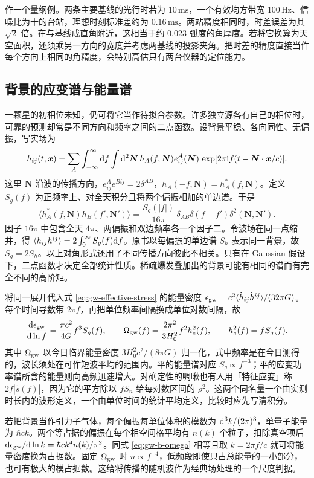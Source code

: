 作一个量纲例。两条主要基线的光行时若为 $10\,\mathrm{ms}$，一个有效均方带宽 $100\,\mathrm{Hz}$、信噪比为十的台站，理想时刻标准差约为 $0.16\,\mathrm{ms}$。两站精度相同时，时差误差为其 $\sqrt2$ 倍。在与基线成直角附近，这相当于约 $0.023$ 弧度的角厚度。若将它换算为天空面积，还须乘另一方向的宽度并考虑两基线的投影夹角。把时差的精度直接当作每个方向上相同的角精度，会特别高估只有两台仪器的定位能力。

\subsection{背景的应变谱与能量谱}\label{sec:gw-b-background}
一颗星的初相位未知，仍可将它当作待拟合参数。许多独立源各有自己的相位时，可靠的预测却常是不同方向和频率之间的二点函数。设背景平稳、各向同性、无偏振，写实场为
\[
 h_{ij}(t,\bm x)=\sum_A\int_{-\infty}^\infty\dd f\int\dd^2\bm N\,
  h_A(f,\bm N)e^A_{ij}(\bm N)\,
  \exp[2\pi\mathrm{i} f(t-\bm N\cdot\bm x/c)] .
\]
这里 $\bm N$ 沿波的传播方向，$e^A_{ij}e^{Bij}=2\delta^{AB}$，$h_A(-f,\bm N)=h_A^*(f,\bm N)$。定义 $S_g(f)$ 为正频率上、对全天积分且将两个偏振相加的单边谱。于是
\[
 \langle h_A^*(f,\bm N)h_B(f',\bm N')\rangle
 =\frac{S_g(|f|)}{16\pi}\,
 \delta_{AB}\delta(f-f')\delta^2(\bm N,\bm N') .
\]
因子 $16\pi$ 中包含全天 $4\pi$、两偏振和双边频率各一个因子二。令波场在同一点缩并，得 $\langle h_{ij}h^{ij}\rangle=2\int_0^\infty S_g(f)\dd f$。原书以每偏振的单边谱 $S_h$ 表示同一背景，故 $S_g=2S_h$。以上对角形式还用了不同传播方向彼此不相关。只有在 Gaussian 假设下，二点函数才决定全部统计性质。稀疏爆发叠加出的背景可能有相同的谱而有完全不同的高阶矩。

将同一展开代入式 \eqref{eq:gw-effective-stress} 的能量密度 $\epsilon_{\rm gw}=c^2\langle\dot h_{ij}\dot h^{ij}\rangle/(32\pi G)$。每个时间导数带 $2\pi f$，再把单位频率间隔换成单位对数间隔，故
\begin{equation}\label{eq:gw-b-omega}
 \frac{\dd\epsilon_{\rm gw}}{\dd\ln f}=\frac{\pi c^2}{4G}f^3 S_g(f),
 \qquad \Omega_{\rm gw}(f)=\frac{2\pi^2}{3H_0^2}f^2h_c^2(f),
 \qquad h_c^2(f)=fS_g(f).
\end{equation}
其中 $\Omega_{\rm gw}$ 以今日临界能量密度 $3H_0^2c^2/(8\pi G)$ 归一化，式中频率是在今日测得的，波长须处在可作短波平均的范围内。平的能量谱对应 $S_g\propto f^{-3}$；平的应变功率谱所含的能量则向高频迅速增大。对确定性的啁啾也有人用「特征应变」称 $2f|\tilde s(f)|$，因为它的平方除以 $fS_n$ 给每对数区间的 $\rho^2$。这两个同名量一个由实测时长内的波形定义，一个由单位时间的统计平均定义，比较时应先写清积分。

若把背景当作引力子气体，每个偏振每单位体积的模数为 $\dd^3 k/(2\pi)^3$，单量子能量为 $\hbar c k$。两个等占据的偏振在每个相空间格平均有 $n(k)$ 个粒子，扣除真空项后 $\dd\epsilon_{\rm gw}/\dd\ln k=\hbar c k^4 n(k)/\pi^2$。同式 \eqref{eq:gw-b-omega} 相等且取 $k=2\pi f/c$ 就可将能量密度换为占据数。固定 $\Omega_{\rm gw}$ 时 $n\propto f^{-4}$，低频段即使只占总能量的一小部分，也可有极大的模占据数。这给将传播的随机波作为经典场处理的一个尺度判据。

